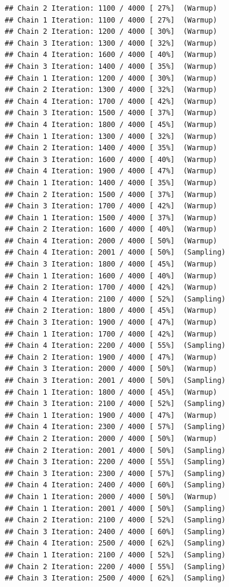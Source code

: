 \documentclass[
]{article}
\begin{document}
\begin{verbatim}
## Chain 2 Iteration: 1100 / 4000 [ 27%]  (Warmup) 
## Chain 1 Iteration: 1100 / 4000 [ 27%]  (Warmup) 
## Chain 2 Iteration: 1200 / 4000 [ 30%]  (Warmup) 
## Chain 3 Iteration: 1300 / 4000 [ 32%]  (Warmup) 
## Chain 4 Iteration: 1600 / 4000 [ 40%]  (Warmup) 
## Chain 3 Iteration: 1400 / 4000 [ 35%]  (Warmup) 
## Chain 1 Iteration: 1200 / 4000 [ 30%]  (Warmup) 
## Chain 2 Iteration: 1300 / 4000 [ 32%]  (Warmup) 
## Chain 4 Iteration: 1700 / 4000 [ 42%]  (Warmup) 
## Chain 3 Iteration: 1500 / 4000 [ 37%]  (Warmup) 
## Chain 4 Iteration: 1800 / 4000 [ 45%]  (Warmup) 
## Chain 1 Iteration: 1300 / 4000 [ 32%]  (Warmup) 
## Chain 2 Iteration: 1400 / 4000 [ 35%]  (Warmup) 
## Chain 3 Iteration: 1600 / 4000 [ 40%]  (Warmup) 
## Chain 4 Iteration: 1900 / 4000 [ 47%]  (Warmup) 
## Chain 1 Iteration: 1400 / 4000 [ 35%]  (Warmup) 
## Chain 2 Iteration: 1500 / 4000 [ 37%]  (Warmup) 
## Chain 3 Iteration: 1700 / 4000 [ 42%]  (Warmup) 
## Chain 1 Iteration: 1500 / 4000 [ 37%]  (Warmup) 
## Chain 2 Iteration: 1600 / 4000 [ 40%]  (Warmup) 
## Chain 4 Iteration: 2000 / 4000 [ 50%]  (Warmup) 
## Chain 4 Iteration: 2001 / 4000 [ 50%]  (Sampling) 
## Chain 3 Iteration: 1800 / 4000 [ 45%]  (Warmup) 
## Chain 1 Iteration: 1600 / 4000 [ 40%]  (Warmup) 
## Chain 2 Iteration: 1700 / 4000 [ 42%]  (Warmup) 
## Chain 4 Iteration: 2100 / 4000 [ 52%]  (Sampling) 
## Chain 2 Iteration: 1800 / 4000 [ 45%]  (Warmup) 
## Chain 3 Iteration: 1900 / 4000 [ 47%]  (Warmup) 
## Chain 1 Iteration: 1700 / 4000 [ 42%]  (Warmup) 
## Chain 4 Iteration: 2200 / 4000 [ 55%]  (Sampling) 
## Chain 2 Iteration: 1900 / 4000 [ 47%]  (Warmup) 
## Chain 3 Iteration: 2000 / 4000 [ 50%]  (Warmup) 
## Chain 3 Iteration: 2001 / 4000 [ 50%]  (Sampling) 
## Chain 1 Iteration: 1800 / 4000 [ 45%]  (Warmup) 
## Chain 3 Iteration: 2100 / 4000 [ 52%]  (Sampling) 
## Chain 1 Iteration: 1900 / 4000 [ 47%]  (Warmup) 
## Chain 4 Iteration: 2300 / 4000 [ 57%]  (Sampling) 
## Chain 2 Iteration: 2000 / 4000 [ 50%]  (Warmup) 
## Chain 2 Iteration: 2001 / 4000 [ 50%]  (Sampling) 
## Chain 3 Iteration: 2200 / 4000 [ 55%]  (Sampling) 
## Chain 3 Iteration: 2300 / 4000 [ 57%]  (Sampling) 
## Chain 4 Iteration: 2400 / 4000 [ 60%]  (Sampling) 
## Chain 1 Iteration: 2000 / 4000 [ 50%]  (Warmup) 
## Chain 1 Iteration: 2001 / 4000 [ 50%]  (Sampling) 
## Chain 2 Iteration: 2100 / 4000 [ 52%]  (Sampling) 
## Chain 3 Iteration: 2400 / 4000 [ 60%]  (Sampling) 
## Chain 4 Iteration: 2500 / 4000 [ 62%]  (Sampling) 
## Chain 1 Iteration: 2100 / 4000 [ 52%]  (Sampling) 
## Chain 2 Iteration: 2200 / 4000 [ 55%]  (Sampling) 
## Chain 3 Iteration: 2500 / 4000 [ 62%]  (Sampling) 

\end{verbatim}
\end{document}
